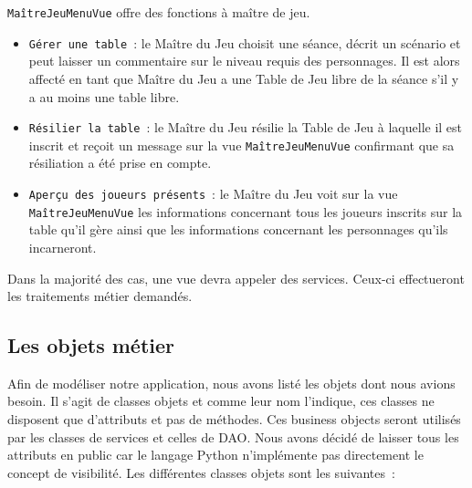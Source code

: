 \documentclass[11pt]{article}
\begin{document}
\texttt{MaîtreJeuMenuVue} offre des fonctions à maître de jeu.
\begin{itemize}[label=, font=\small]
    \item\texttt{Gérer une table}~: le Maître du Jeu choisit une séance, décrit un scénario et peut laisser un commentaire sur le niveau requis des personnages. Il est alors affecté en tant que Maître du Jeu a une Table de Jeu libre de la séance s'il y a au moins une table libre.
    \item\texttt{Résilier la table}~: le Maître du Jeu résilie la Table de Jeu à laquelle il est inscrit et reçoit un message sur la vue \texttt{MaîtreJeuMenuVue} confirmant que sa résiliation a été prise en compte.
    \item\texttt{Aperçu des joueurs présents}~: le Maître du Jeu voit sur la vue \texttt{MaîtreJeuMenuVue} les informations concernant tous les joueurs inscrits sur la table qu'il gère ainsi que les informations concernant les personnages qu'ils incarneront.
\end{itemize}


\bigbreak
Dans la majorité des cas, une vue devra appeler des services. Ceux-ci effectueront les traitements métier demandés.


\subsection{Les objets métier}

Afin de modéliser notre application, nous avons listé les objets dont nous avions besoin. Il s’agit de classes objets et comme leur nom l’indique, ces classes ne disposent que d’attributs et pas de méthodes. Ces business objects seront utilisés par les classes de services et celles de DAO. Nous avons décidé de laisser tous les attributs en public car le langage Python n'implémente pas directement le concept de visibilité. Les différentes classes objets sont les suivantes~:

\bigbreak
\end{document}
